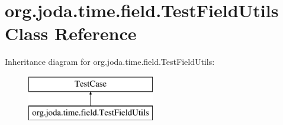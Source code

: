 \hypertarget{classorg_1_1joda_1_1time_1_1field_1_1_test_field_utils}{\section{org.\-joda.\-time.\-field.\-Test\-Field\-Utils Class Reference}
\label{classorg_1_1joda_1_1time_1_1field_1_1_test_field_utils}
}
Inheritance diagram for org.\-joda.\-time.\-field.\-Test\-Field\-Utils\-:\begin{figure}[H]
\begin{center}
\leavevmode
\includegraphics[height=2.000000cm]{classorg_1_1joda_1_1time_1_1field_1_1_test_field_utils}
\end{center}
\end{figure}
